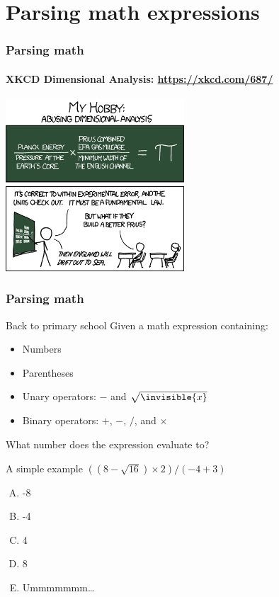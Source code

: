 \section{Parsing math expressions}
\label{sec:parsing_math_expressions}

\begin{frame}
	\frametitle{Parsing math}
	\framesubtitle{XKCD Dimensional Analysis: \url{https://xkcd.com/687/}}
	\begin{center}
		\includegraphics[width=0.5\textwidth]{figures/math.png}\\
	\end{center}
\end{frame}

\begin{frame}
	\frametitle{Parsing math}
	
	\begin{problemblock}{Back to primary school}
		Given a math expression containing:
		\begin{itemize}
			\item Numbers
			\item Parentheses
			\item Unary operators: $-$ and $\sqrt{\invisible{x}}$
			\item Binary operators: $+$, $-$, $/$, and $\times$
		\end{itemize}
		What number does the expression evaluate to?
	\end{problemblock}
	\pause
	\begin{questionblock}{A simple example}
		$((8-\sqrt{16})\times 2) / (-4 + 3)$
		\vspace{-10pt}
		\begin{multicols}{2}
		\begin{enumerate}[A.]
			\item -8
			\item -4
			\item 4
			\item 8
			\item Ummmmmmm\dots
		\end{enumerate}
		\end{multicols}
	\end{questionblock}
\end{frame}

